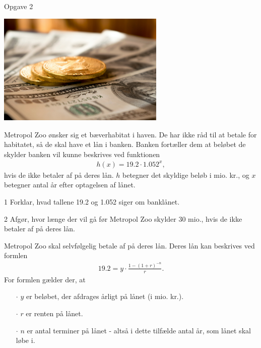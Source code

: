 \begin{opgavetekst}{Opgave 2}
	\begin{center}
		\includegraphics[width=0.6\textwidth]{Billeder/penge}
	\end{center}
	Metropol Zoo ønsker sig et bæverhabitat i haven. De har ikke råd til 
	at betale for habitatet, så de skal have et lån i banken. Banken fortæller 
	dem at beløbet de skylder banken vil kunne beskrives ved funktionen 
	\begin{align*}
		h(x) = 19.2\cdot 1.052^x,
	\end{align*}
	hvis de ikke betaler af på deres lån. $h$ betegner det skyldige beløb i mio. kr.,
	og $x$ betegner antal år efter optagelsen af lånet. 
\end{opgavetekst}
\begin{delopgave}{}{1}
	Forklar, hvad tallene 19.2 og 1.052 siger om banklånet.
\end{delopgave}
\begin{delopgave}{}{2}
	Afgør, hvor længe der vil gå før Metropol Zoo skylder 30 mio., hvis de ikke betaler af på
	deres lån.
\end{delopgave}
\begin{meretekst}
	Metropol Zoo skal selvfølgelig betale af på deres lån. Deres lån kan beskrives ved formlen
	\begin{align*}
		19.2 = y\cdot \frac{1 - (1+r)^{-n}}{r}.
	\end{align*}
	For formlen gælder der, at 
	\begin{itemize}
		\item[$\cdot$] $y$ er beløbet, der afdrages årligt på lånet (i mio. kr.).
		\item[$\cdot$] $r$ er renten på lånet. 
		\item[$\cdot$] $n$ er antal terminer på lånet - altså i dette tilfælde antal år, som 
		lånet skal løbe i.  	
	\end{itemize}
	\phantom{h}
\end{meretekst}	
